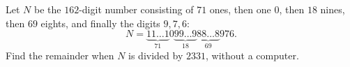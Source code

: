 Let $N$ be the $162$-digit number consisting of $71$ ones, then one $0$, then $18$ nines, then $69$ eights, and finally the digits $9,7,6$:
\[N=\underbrace{11\ldots1}_{71}0\underbrace{99\ldots9}_{18}\underbrace{88\ldots8}_{69}976.\]
Find the remainder when $N$ is divided by $2331$, without a computer.
